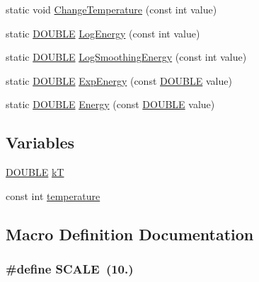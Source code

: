 \begin{DoxyCompactItemize}
\item 
static void \hyperlink{num__operator_8hh_ab4a68ddf8c09397ded6e38315289241f}{Change\+Temperature} (const int value)
\item 
static \hyperlink{energy__const_8hh_a8747af38b86aa2bbcda2f1b1aa0888c2}{D\+O\+U\+B\+L\+E} \hyperlink{num__operator_8hh_a590275b84bd71f97ca6c2dc854d90d7f}{Log\+Energy} (const int value)
\item 
static \hyperlink{energy__const_8hh_a8747af38b86aa2bbcda2f1b1aa0888c2}{D\+O\+U\+B\+L\+E} \hyperlink{num__operator_8hh_a7ab48a3f89b2fa34ecd4c109ebc6d5bf}{Log\+Smoothing\+Energy} (const int value)
\item 
static \hyperlink{energy__const_8hh_a8747af38b86aa2bbcda2f1b1aa0888c2}{D\+O\+U\+B\+L\+E} \hyperlink{num__operator_8hh_ac8c038b1048e530defe0fb3cd897f900}{Exp\+Energy} (const \hyperlink{energy__const_8hh_a8747af38b86aa2bbcda2f1b1aa0888c2}{D\+O\+U\+B\+L\+E} value)
\item 
static \hyperlink{energy__const_8hh_a8747af38b86aa2bbcda2f1b1aa0888c2}{D\+O\+U\+B\+L\+E} \hyperlink{num__operator_8hh_a5aff2cb259eecce13bcf55ef672f9a6c}{Energy} (const \hyperlink{energy__const_8hh_a8747af38b86aa2bbcda2f1b1aa0888c2}{D\+O\+U\+B\+L\+E} value)
\end{DoxyCompactItemize}
\subsection*{Variables}
\begin{DoxyCompactItemize}
\item 
\hyperlink{energy__const_8hh_a8747af38b86aa2bbcda2f1b1aa0888c2}{D\+O\+U\+B\+L\+E} \hyperlink{num__operator_8hh_ad41fe83f95add9cc649f41be659389cb}{k\+T}
\item 
const int \hyperlink{num__operator_8hh_a9bb68aa6c4819d6d9361d10f2d5829ae}{temperature}
\end{DoxyCompactItemize}


\subsection{Macro Definition Documentation}
\hypertarget{num__operator_8hh_a0cbea62f1ce2043dd08108e65ed8de1d}{
\subsubsection[{S\+C\+A\+L\+E}]{\setlength{\rightskip}{0pt plus 5cm}\#define S\+C\+A\+L\+E~(10.)}}\label{num__operator_8hh_a0cbea62f1ce2043dd08108e65ed8de1d}


